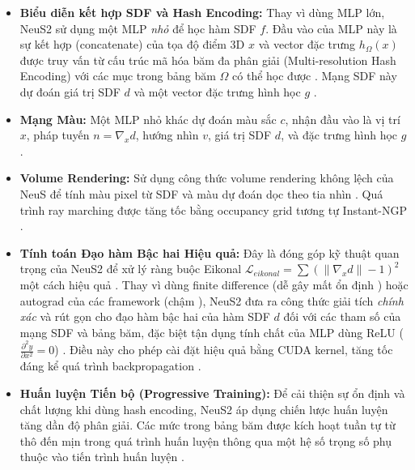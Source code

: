 \begin{itemize}
    \item \textbf{Biểu diễn kết hợp SDF và Hash Encoding:} Thay vì dùng MLP lớn, NeuS2 sử dụng một MLP \textit{nhỏ} để học hàm SDF $f$. Đầu vào của MLP này là sự kết hợp (concatenate) của tọa độ điểm 3D $x$ và vector đặc trưng $h_\Omega(x)$ được truy vấn từ cấu trúc mã hóa băm đa phân giải (Multi-resolution Hash Encoding) với các mục trong bảng băm $\Omega$ có thể học được \cite{Wang2023NeuS2_source_4, Wang2023NeuS2_source_22, Wang2023NeuS2_source_86, Wang2023NeuS2_source_110, Wang2023NeuS2_source_112}. Mạng SDF này dự đoán giá trị SDF $d$ và một vector đặc trưng hình học $g$ \cite{Wang2023NeuS2_source_112}.
    \item \textbf{Mạng Màu:} Một MLP nhỏ khác dự đoán màu sắc $c$, nhận đầu vào là vị trí $x$, pháp tuyến $n = \nabla_x d$, hướng nhìn $v$, giá trị SDF $d$, và đặc trưng hình học $g$ \cite{Wang2023NeuS2_source_114, Wang2023NeuS2_source_115}.
    \item \textbf{Volume Rendering:} Sử dụng công thức volume rendering không lệch của NeuS \cite{Wang2021NeuS} để tính màu pixel từ SDF và màu dự đoán dọc theo tia nhìn \cite{Wang2023NeuS2_source_116, Wang2023NeuS2_source_405, Wang2023NeuS2_source_409}. Quá trình ray marching được tăng tốc bằng occupancy grid tương tự Instant-NGP \cite{Wang2023NeuS2_source_117, Wang2023NeuS2_source_411, Wang2023NeuS2_source_412}.
    \item \textbf{Tính toán Đạo hàm Bậc hai Hiệu quả:} Đây là đóng góp kỹ thuật quan trọng của NeuS2 để xử lý ràng buộc Eikonal $\mathcal{L}_{eikonal} = \sum (\|\nabla_x d\| - 1)^2$ một cách hiệu quả \cite{Wang2023NeuS2_source_119, Wang2023NeuS2_source_120}. Thay vì dùng finite difference (dễ gây mất ổn định \cite{Wang2023NeuS2_source_99, Wang2023NeuS2_source_178}) hoặc autograd của các framework (chậm \cite{Wang2023NeuS2_source_124}), NeuS2 đưa ra công thức giải tích \textit{chính xác} và rút gọn cho đạo hàm bậc hai của hàm SDF $d$ đối với các tham số của mạng SDF và bảng băm, đặc biệt tận dụng tính chất của MLP dùng ReLU ($\frac{\partial^2 y}{\partial x^2} = 0$) \cite{Wang2023NeuS2_source_4, Wang2023NeuS2_source_25, Wang2023NeuS2_source_32, Wang2023NeuS2_source_100, Wang2023NeuS2_source_125, Wang2023NeuS2_source_129, Wang2023NeuS2_source_130}. Điều này cho phép cài đặt hiệu quả bằng CUDA kernel, tăng tốc đáng kể quá trình backpropagation \cite{Wang2023NeuS2_source_4, Wang2023NeuS2_source_132}.
    \item \textbf{Huấn luyện Tiến bộ (Progressive Training):} Để cải thiện sự ổn định và chất lượng khi dùng hash encoding, NeuS2 áp dụng chiến lược huấn luyện tăng dần độ phân giải. Các mức trong bảng băm được kích hoạt tuần tự từ thô đến mịn trong quá trình huấn luyện thông qua một hệ số trọng số phụ thuộc vào tiến trình huấn luyện \cite{Wang2023NeuS2_source_5, Wang2023NeuS2_source_26, Wang2023NeuS2_source_33, Wang2023NeuS2_source_109, Wang2023NeuS2_source_135, Wang2023NeuS2_source_136, Wang2023NeuS2_source_137}.
\end{itemize}

